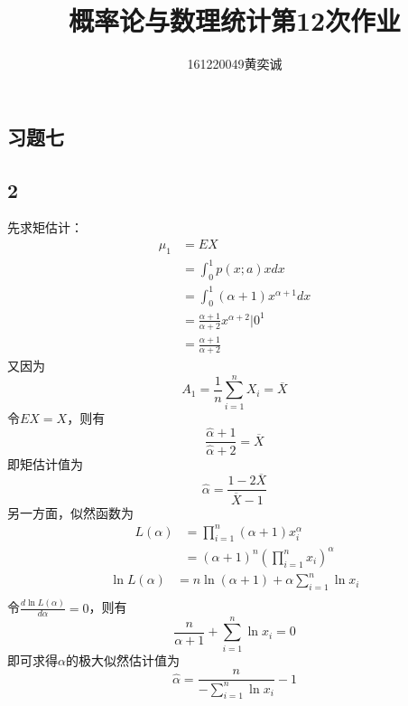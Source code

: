 \documentclass[twocolumn]{article}
\begin{document}
	\begin{CJK}{UTF8}{gbsn}		
			\title{概率论与数理统计第12次作业}
			\author{161220049\quad 黄奕诚}
			\maketitle
			
			\section*{习题七}
			\subsection*{2}
				先求矩估计：\begin{align*}
					\mu_1 & = EX\\
					& = \int_{0}^{1}p(x;a)xdx \\
					& = \int_{0}^{1}(\alpha+1)x^{\alpha+1} dx\\
					& = \frac{\alpha+1}{\alpha+2}x^{\alpha+2}|0^1 \\
					& = \frac{\alpha+1}{\alpha+2}
				\end{align*}
				又因为\[A_1=\frac{1}{n}\sum_{i=1}^{n}X_i=\overline{X}\]令$EX=X$，则有\[\frac{\hat{\alpha}+1}{\hat{\alpha}+2}=\overline{X}\]即矩估计值为\[\hat{\alpha}=\frac{1-2\overline{X}}{\overline{X}-1}\]另一方面，似然函数为\begin{align*}
					L(\alpha) & = \prod_{i=1}^{n}(\alpha+1)x_i^{\alpha}\\
					& = (\alpha+1)^n(\prod_{i=1}^{n}x_i)^\alpha
				\end{align*}
				\begin{align*}
					\ln L(\alpha) & = n\ln(\alpha+1)+\alpha\sum_{i=1}^{n}\ln x_i\\
				\end{align*}
				令$\frac{d\ln L(\alpha)}{d\alpha} = 0$，则有\[\frac{n}{\alpha+1}+\sum_{i=1}^{n}\ln x_i=0\]即可求得$\alpha$的极大似然估计值为\[\hat{\alpha}=\frac{n}{-\sum_{i=1}^{n}\ln x_i}-1\]

\end{CJK}
\end{document}
